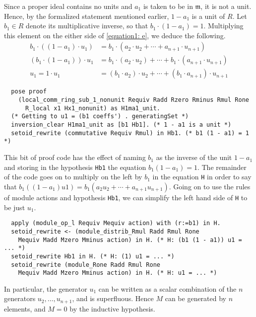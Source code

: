 \documentclass{article}
\begin{document}
Since a proper ideal contains no units and $a_1$ is taken to be in
$\mathfrak{m}$, it is not a unit. Hence, by the formalized statement mentioned
earlier, $1 - a_{1}$ is a unit of $R$. Let $b_{1} \in R$ denote its 
multiplicative inverse, so that $b_1 \cdot  (1 - a_{1}) = 1$. Multiplying this
element on the either side of \eqref{equation1: e}, we deduce the following.  
\begin{align*}
b_1 \cdot \left((1 - a_{1}) \cdot u_{1} \right)
  & = b_1 \cdot (a_{2} \cdot u_{2} + \cdots + a_{n+1} \cdot u_{n+1}) \\
\left( b_1 \cdot (1 - a_{1})\right) \cdot u_{1}
  & = b_1 \cdot (a_{2} \cdot u_{2}) + \cdots + b_1 \cdot (a_{n+1} \cdot u_{n+1}) \\
u_1 = 1 \cdot u_{1}
  & = (b_1 \cdot  a_{2}) \cdot u_{2} + \cdots + (b_1  \cdot  a_{n+1}) \cdot u_{n+1}  
\end{align*}
\begin{verbatim}
  pose proof
    (local_comm_ring_sub_1_nonunit Requiv Radd Rzero Rminus Rmul Rone
      R_local x1 Hx1_nonunit) as H1ma1_unit.
  (* Getting to u1 = (b1 coeffs') . generatingSet *)
  inversion_clear H1ma1_unit as [b1 Hb1]. (* 1 - a1 is a unit *)
  setoid_rewrite (commutative Requiv Rmul) in Hb1. (* b1 (1 - a1) = 1 *)
\end{verbatim}
This bit of proof code has the effect of naming \(b_{1}\) as the inverse of the
unit \(1 - a_{1}\) and storing in the hypothesis \texttt{Hb1} the equation
\(b_{1} (1 - a_{1}) = 1\). The remainder of the code goes on to multiply on the
left by \(b_{1}\) in the equation \texttt{H} in order to say that
\(b_{1} ((1 - a_{1}) u1) = b_{1} (a_{2} u_{2} + \cdots + a_{n+1} u_{n+1})\).
Going on to use the rules of module actions and hypothesis \texttt{Hb1}, we can
simplify the left hand side of \texttt{H} to be just \(u_{1}\).
\begin{verbatim}
  apply (module_op_l Requiv Mequiv action) with (r:=b1) in H.
  setoid_rewrite <- (module_distrib_Rmul Radd Rmul Rone
    Mequiv Madd Mzero Mminus action) in H. (* H: (b1 (1 - a1)) u1 = ... *)
  setoid_rewrite Hb1 in H. (* H: (1) u1 = ... *)
  setoid_rewrite (module_Rone Radd Rmul Rone
    Mequiv Madd Mzero Mminus action) in H. (* H: u1 = ... *)
\end{verbatim}
In particular, the generator $u_1$ can be written as a scalar combination of
the $n$ generators $u_2, \ldots, u_{n+1}$, and is superfluous. Hence $M$ can be
generated by $n$ elements, and $M=0$ by the inductive hypothesis. 
\end{document}
